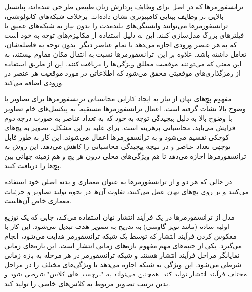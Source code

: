 ترانسفورمرها که در اصل برای وظایف پردازش زبان طبیعی طراحی شده‌اند، پتانسیل بالایی در وظایف بینایی کامپیوتری نشان داده‌اند. برخلاف شبکه‌های کانولوشنی، ترانسفورمرها می‌توانند وابستگی‌های بلندمدت را بدون نیاز به شبکه‌های عمیق یا فیلترهای بزرگ مدل‌سازی کنند. این به دلیل استفاده از مکانیزم‌های توجه به خود است که به هر عنصر ورودی اجازه می‌دهد با تمام عناصر دیگر، بدون توجه به فاصله‌شان، تعامل داشته باشد. علاوه بر این، ترانسفورمرها نسبت به انتقال مکان مقاوم نیستند، به این معنی که می‌توانند موقعیت مطلق ویژگی‌ها را دریافت کنند. این از طریق استفاده از رمزگذاری‌های موقعیتی محقق می‌شود که اطلاعاتی در مورد موقعیت هر عنصر در ورودی اضافه می‌کند.




مفهوم پچ‌های نهان از نیاز به ایجاد کارایی محاسباتی ترانسفورمرها برای تصاویر با وضوح بالا نشأت گرفته است. اعمال ترانسفورمرها مستقیماً به پیکسل‌های خام تصاویر با وضوح بالا به دلیل پیچیدگی توجه به خود که به تعداد عناصر به صورت درجه دوم افزایش می‌یابد، محاسباتی پرهزینه است. برای غلبه بر این مشکل، تصویر به پچ‌های کوچکی تقسیم می‌شود و به ترانسفورمرها اعمال می‌شوند. این کار به طور قابل توجهی تعداد عناصر و در نتیجه پیچیدگی محاسباتی را کاهش می‌دهد. این روش به ترانسفورمرها اجازه می‌دهد تا هم ویژگی‌های محلی درون هر پچ و هم زمینه جهانی بین پچ‌ها را دریافت کنند.







در حالی که هر دو  و  از ترانسفورمرها به عنوان معماری و بدنه اصلی خود استفاده می‌کنند و بر روی پچ‌های نهان عمل می‌کنند، تفاوت آن‌ها در نحوه تولید تصاویر و جزئیات معماری خاص آن‌هاست.



مدل  از ترانسفورمرها در یک فرآیند انتشار نهان استفاده می‌کند، جایی که یک توزیع اولیه ساده (مانند نویز گاوسی) به تدریج به تصویر هدف تبدیل می‌شود. این کار با معکوس کردن فرآیند انتشار که توسط یک شبکه ترانسفورمر هدایت می‌شود، انجام می‌گیرد. یکی از جنبه‌های مهم  مفهوم بازه‌های زمانی انتشار است. این بازه‌های زمانی نمایانگر مراحل فرآیند انتشار هستند و شبکه ترانسفورمر در هر مرحله به بازه زمانی شرطی می‌شود. این ویژگی به شبکه اجازه می‌دهد تا ویژگی‌های مختلف را در مراحل مختلف فرآیند انتشار تولید کند.  همچنین می‌تواند به "برچسب‌های کلاس" شرطی شود و بدین ترتیب تصاویر مربوط به کلاس‌های خاصی را تولید کند.







